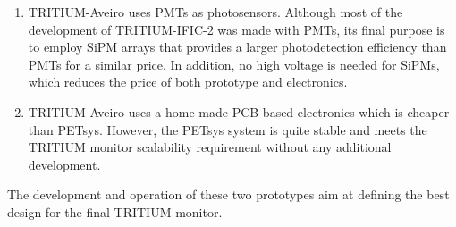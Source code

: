 \begin{enumerate}
\item{} TRITIUM-Aveiro uses PMTs as photosensors. Although most of the development of TRITIUM-IFIC-2 was made with PMTs, its final purpose is to employ SiPM arrays that provides a larger photodetection efficiency than PMTs for a similar price. In addition, no high voltage is needed for SiPMs, which reduces the price of both prototype and electronics.

\item{} TRITIUM-Aveiro uses a home-made PCB-based electronics which is cheaper than PETsys. However, the PETsys system is quite stable and meets the TRITIUM monitor scalability requirement without any additional development.

\end{enumerate}

The development and operation of these two prototypes aim at defining the best design for the final TRITIUM monitor.
